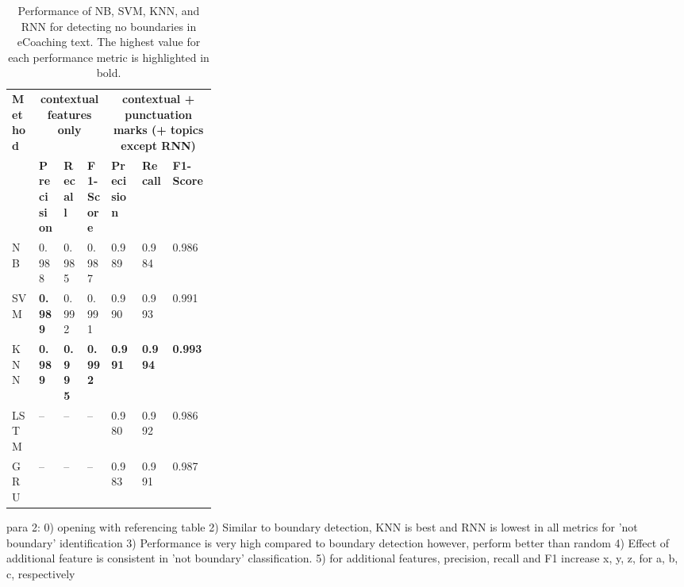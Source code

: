\documentclass{amia}
\begin{document}
\begin{table}[ht]
\centering
\caption{Performance of NB, SVM, KNN, and RNN  for detecting no boundaries in eCoaching text. The highest value for each performance metric is highlighted in bold.}
\label{tab:result_not_boundary}
  \begin{tabular}{|l|l|l|l|p{0.15\linewidth}|p{0.15\linewidth}|l|}
  \hline
   \multirow{2}{*}{\textbf{Method}} & \multicolumn{3}{|c|}{\textbf{contextual features only}} & \multicolumn{3}{|c|}{\textbf{contextual + punctuation marks (+ topics except RNN)}} \\\cline{2-7}
   & \textbf{Precision}  & \textbf{Recall} & \textbf{F1-Score} & \textbf{Precision}  & \textbf{Recall} & \textbf{F1-Score}\\ \hline    
    
 NB & 0.988 & 0.985 & 0.987 & 0.989 & 0.984 & 0.986 \\ \hline
 SVM & \textbf{0.989} & 0.992 & 0.991 & 0.990 & 0.993 & 0.991\\ \hline
 KNN & \textbf{0.989} & \textbf{0.995} & \textbf{0.992} & \textbf{0.991} & \textbf{0.994} & \textbf{0.993}\\ \hline
 LSTM & -- & -- & -- & 0.980 & 0.992 & 0.986 \\ \hline
 GRU & -- & -- & -- & 0.983 & 0.991 & 0.987 \\ \hline 
  \end{tabular}
\end{table}

para 2:
0) opening with referencing table
2) Similar to boundary detection, KNN is best and RNN is lowest in all metrics for 'not boundary' identification
3) Performance is very high compared to boundary detection however, perform better than random
4) Effect of additional feature is consistent in 'not boundary' classification.
5) for additional features, precision, recall and F1 increase x, y, z, for a, b, c, respectively \\
\end{document}
